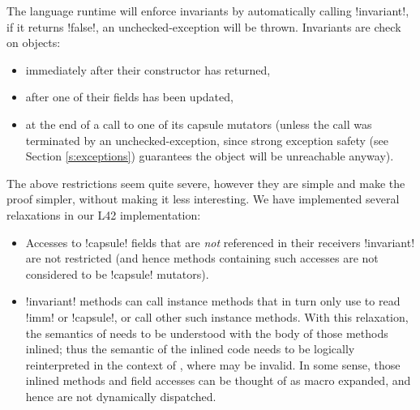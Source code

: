 The language runtime will enforce invariants by automatically calling \Q!invariant!, if it returns \Q!false!, an unchecked-exception will be thrown. Invariants are check on objects:
\begin{itemize}
	\item immediately after their constructor has returned,
	\item after one of their fields has been updated,
	\item at the end of a call to one of its capsule mutators (unless the call was terminated by an unchecked-exception, since strong exception safety (see Section \ref{s:exceptions}) guarantees the object will be unreachable anyway).
\end{itemize}

The above restrictions seem quite severe, however they are simple and make the proof simpler, without making it less interesting. We have implemented several relaxations in our L42 implementation:
\begin{itemize}
	\item Accesses to \Q!capsule! fields that are \emph{not} referenced in their receivers \Q!invariant! are not restricted (and hence methods containing such accesses are not considered to be \Q!capsule! mutators).
	
	\item \Q!invariant! methods can call instance methods that in turn only use \Q@this@ to read \Q!imm! or \Q!capsule!, or call other such instance methods. With this relaxation, the semantics of \Q@invariant@ needs to be understood with the body of those methods inlined; thus the semantic of the inlined code needs to be logically reinterpreted in the context of \Q@invariant@, where \Q@this@ may be invalid. In some sense, those inlined methods and field accesses can be thought of as macro expanded, and hence are not dynamically dispatched. 

\end{itemize}

